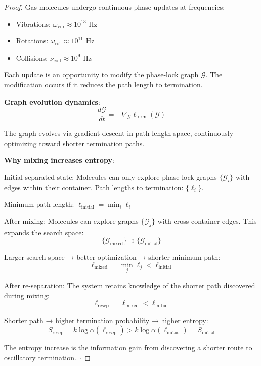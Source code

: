 \documentclass[12pt,a4paper]{article}
\theoremstyle{remark}
\begin{document}
\begin{proof}
Gas molecules undergo continuous phase updates at frequencies:
\begin{itemize}
\item Vibrations: $\omega_{\text{vib}} \approx 10^{13}$ Hz
\item Rotations: $\omega_{\text{rot}} \approx 10^{11}$ Hz
\item Collisions: $\nu_{\text{coll}} \approx 10^9$ Hz
\end{itemize}

Each update is an opportunity to modify the phase-lock graph $\mathcal{G}$. The modification occurs if it reduces the path length to termination.

\textbf{Graph evolution dynamics}:
\begin{equation}
\frac{d\mathcal{G}}{dt} = -\nabla_{\mathcal{G}} \ell_{\text{term}}(\mathcal{G})
\end{equation}

The graph evolves via gradient descent in path-length space, continuously optimizing toward shorter termination paths.

\textbf{Why mixing increases entropy}:

Initial separated state: Molecules can only explore phase-lock graphs $\{\mathcal{G}_i\}$ with edges within their container. Path lengths to termination: $\{\ell_i\}$.

Minimum path length: $\ell_{\text{initial}} = \min_i \ell_i$

After mixing: Molecules can explore graphs $\{\mathcal{G}_j\}$ with cross-container edges. This expands the search space:
\begin{equation}
\{\mathcal{G}_{\text{mixed}}\} \supset \{\mathcal{G}_{\text{initial}}\}
\end{equation}

Larger search space → better optimization → shorter minimum path:
\begin{equation}
\ell_{\text{mixed}} = \min_j \ell_j < \ell_{\text{initial}}
\end{equation}

After re-separation: The system retains knowledge of the shorter path discovered during mixing:
\begin{equation}
\ell_{\text{resep}} = \ell_{\text{mixed}} < \ell_{\text{initial}}
\end{equation}

Shorter path → higher termination probability → higher entropy:
\begin{equation}
S_{\text{resep}} = k \log \alpha(\ell_{\text{resep}}) > k \log \alpha(\ell_{\text{initial}}) = S_{\text{initial}}
\end{equation}

The entropy increase is the information gain from discovering a shorter route to oscillatory termination. $\square$
\end{proof}
\end{document}
